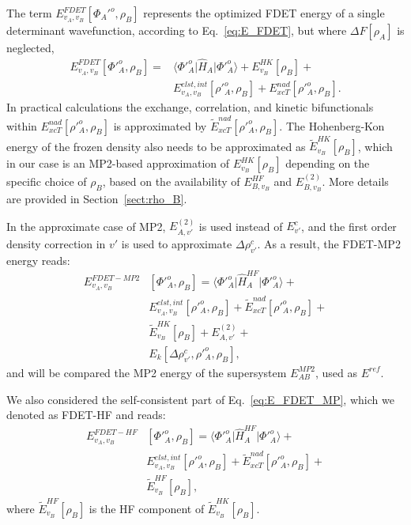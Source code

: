 \documentclass[journal=jctcce,manuscript=article, layout=twocolumn]{achemso}
\begin{document}
The term $E_{v_A,v_B}^{FDET}[\Phi_{A}'^{o},\rho_B]$ represents the optimized FDET energy of a single determinant wavefunction, according to Eq.~\ref{eq:E_FDET}, but where $\Delta F[\rho_A]$ is neglected,
\begin{align} \label{eq:E_FDET_v'}
{E}_{v_A,v_B}^{FDET}[\Phi'^{o}_{A},\rho_B] = & \langle\Phi'^{o}_{A}\vert \hat{H}_A\vert \Phi'^{o}_{A}\rangle + E^{HK}_{v_B}[\rho_B] + \\ \nonumber
& E^{elst,int}_{v_A,v_B}[\rho'^{o}_A,\rho_B] + E_{xcT}^{nad}[\rho'^{o}_A,\rho_B]. 
\end{align}
In practical calculations the exchange, correlation, and kinetic bifunctionals within $E_{xcT}^{nad}[\rho'^{o}_A,\rho_B]$ is approximated by $\tilde{E}_{xcT}^{nad}[\rho'^{o}_A,\rho_B]$.
The Hohenberg-Kon energy of the frozen density also needs to be approximated as $ \tilde{E}^{HK}_{v_B}[\rho_B]$, which in our case is an MP2-based approximation of $E^{HK}_{v_B}[\rho_B]$ depending on the specific choice of $\rho_B$, based on the availability of $E^{HF}_{B,v_B}$ and $E^{(2)}_{B,v_B}$. More details are provided in Section~\ref{sect:rho_B}.

In the approximate case of MP2, $E^{(2)}_{A,v'}$ is used instead of $E^c_{v'}$, and the first order density correction in $v'$ is used to approximate  $\Delta \rho^c_{v'}$.
As a result, the FDET-MP2 energy reads:
\begin{align} \label{eq:E_FDET_MP}
 E_{v_A,v_B}^{FDET-MP2} & [\Phi'^{o}_{A},\rho_B] =  \langle\Phi'^{o}_{A}\vert \hat{H}^{HF}_A\vert \Phi'^{o}_{A}\rangle + \\ \nonumber
& E^{elst,int}_{v_A,v_B}[\rho'^{o}_A,\rho_B] + \tilde{E}_{xcT}^{nad}[\rho'^{o}_A,\rho_B] + \\ \nonumber
& \tilde{E}^{HK}_{v_B}[\rho_B] + E^{(2)}_{A,v'} + \\ \nonumber 
& E_k[\Delta \rho^c_{v'}, \rho'^{o}_A, \rho_B],
\end{align}
and will be compared the MP2 energy of the supersystem $E^{MP2}_{AB}$, used as $E^{ref}$.

We also considered the self-consistent part of Eq.~\ref{eq:E_FDET_MP}, which we denoted as FDET-HF and reads:
\begin{align} \label{eq:E_FDET_HF}
 E_{v_A,v_B}^{FDET-HF} & [\Phi'^{o}_{A},\rho_B] =  \langle\Phi'^{o}_{A}\vert \hat{H}^{HF}_A\vert \Phi'^{o}_{A}\rangle + \\ \nonumber
& E^{elst,int}_{v_A,v_B}[\rho'^{o}_A,\rho_B] + \tilde{E}_{xcT}^{nad}[\rho'^{o}_A,\rho_B] + \\ \nonumber
& \tilde{E}^{HF}_{v_B}[\rho_B],
\end{align}
where $\tilde{E}^{HF}_{v_B}[\rho_B]$ is the HF component of $ \tilde{E}^{HK}_{v_B}[\rho_B]$.
\end{document}
